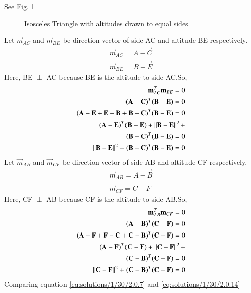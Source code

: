 See Fig. \ref{eq:myfig:solutions/1/30/}

\begin{figure}[!ht]
\centering
\resizebox{\columnwidth}{!}{}
\caption{Isosceles Triangle with altitudes drawn to equal sides}
\label{eq:myfig:solutions/1/30/}
\end{figure}
 Let $\vec{m}_{AC}$ and $\vec{m}_{BE}$ be direction vector of side AC and altitude BE respectively.
 \begin{align}
 \vec{m}_{AC}=\vec{A-C}\\
 \vec{m}_{BE}=\vec{B-E}
 \end{align}
Here, BE  $\perp$ AC because BE is the altitude to side AC.So,
 \begin{align}
 \mathbf{m}_{AC}^{T}\mathbf{m}_{BE}=0\\
 \mathbf{(A-C)}^T\mathbf{(B-E)}=0\\
  \mathbf{(A-E+E-B+B-C)}^T\mathbf{(B-E)}=0\\
\mathbf{(A-E)}^T\mathbf{(B-E)}+\left\lVert\mathbf{B-E}\right\rVert^2+\\ \mathbf{(B-C)}^T\mathbf{(B-E)}=0
\\
\left\lVert\mathbf{B-E}\right\rVert^2+\mathbf{(B-C)}^T\mathbf{(B-E)}=0 
\label{eq:solutions/1/30/2.0.7}
\end{align}
 Let $\vec{m}_{AB}$ and $\vec{m}_{CF}$ be direction vector of side AB and altitude CF respectively.
 \begin{align}
 \vec{m}_{AB}=\vec{A-B}\\
 \vec{m}_{CF}=\vec{C-F}
 \end{align}
 Here, CF  $\perp$ AB because CF is the altitude to side AB.So,
 \begin{align}
 \mathbf{m}_{AB}^T\mathbf{m}_{CF}=0\\
 \mathbf{(A-B)}^T\mathbf{(C-F)}=0\\
\mathbf{(A-F+F-C+C-B)}^T\mathbf{(C-F)}=0\\
 \mathbf{(A-F)}^T\mathbf{(C-F)}+\left\lVert\mathbf{C-F}\right\rVert^2+\\ \mathbf{(C-B)}^T\mathbf{(C-F)}=0
\\
\left\lVert\mathbf{C-F}\right\rVert^2+\mathbf{(C-B)}^T\mathbf{(C-F)}=0\label{eq:solutions/1/30/2.0.14}
 \end{align}
 Comparing equation \eqref{eq:solutions/1/30/2.0.7} and \eqref{eq:solutions/1/30/2.0.14}
